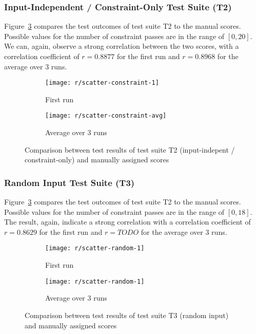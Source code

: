 \subsubsection{Input-Independent / Constraint-Only Test Suite (T2)}

Figure~\ref{fig:scatter_constraint} compares the test outcomes of test suite T2 to the manual scores.
Possible values for the number of constraint passes are in the range of $[0, 20]$.
We can, again, observe a strong correlation between the two scores,
with a correlation coefficient of $r = 0.8877$ for the first run and $r = 0.8968$ for the average over 3 runs.

\begin{figure}[htpb]
    \centering
    \begin{subfigure}{.40\textwidth}
        \texttt{[image: r/scatter-constraint-1]}
        \caption{First run}
        \label{fig:scatter_constraint_1}
    \end{subfigure}%
    \begin{subfigure}{.40\textwidth}
        \texttt{[image: r/scatter-constraint-avg]}
        \caption{Average over 3 runs}
        \label{fig:scatter_constraint_avg}
    \end{subfigure}
    \caption{Comparison between test results of test suite T2 (input-indepent / constraint-only) and manually assigned scores}
    \label{fig:scatter_constraint}
\end{figure}

\subsubsection{Random Input Test Suite (T3)}

Figure~\ref{fig:scatter_constraint} compares the test outcomes of test suite T2 to the manual scores.
Possible values for the number of constraint passes are in the range of $[0, 18]$.
The result, again, indicate a strong correlation with a correlation coefficient of $r = 0.8629$ for the first run and $r = TODO$ for the average over 3 runs.

\begin{figure}[htpb]
    \centering
    \begin{subfigure}{.40\textwidth}
        \texttt{[image: r/scatter-random-1]}
        \caption{First run}
        \label{fig:scatter_random_1}
    \end{subfigure}%
    \begin{subfigure}{.40\textwidth}
        \texttt{[image: r/scatter-random-1]}
        \caption{Average over 3 runs}
        \label{fig:scatter_random_avg}
    \end{subfigure}
    \caption{Comparison between test results of test suite T3 (random input) and manually assigned scores}
    \label{fig:scatter_random}
\end{figure}

